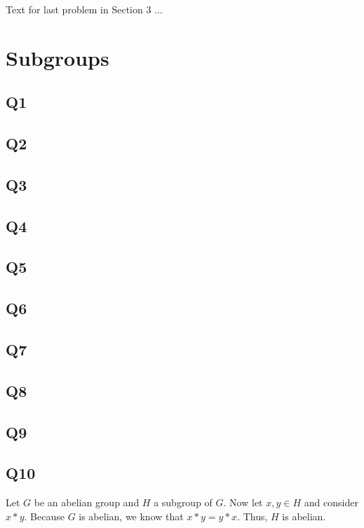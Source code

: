 \documentclass[12pt]{article}
\numberwithin{theorem}{section}
\numberwithin{equation}{section}
\numberwithin{remark}{section}
\numberwithin{definition}{section}
\numberwithin{theorem}{section}
\numberwithin{lemma}{section}
\numberwithin{example}{section}
\begin{document}
Text for last problem in Section 3 ...



\newpage

\section{Subgroups}

\subsection{Q1}

\subsection{Q2}

\subsection{Q3}

\subsection{Q4}

\subsection{Q5}

\subsection{Q6}

\subsection{Q7}

\subsection{Q8}

\subsection{Q9}

\subsection{Q10}

Let $G$ be an abelian group and $H$ a subgroup of $G$. Now let $x,y\in H$ and consider $x*y$. Because $G$ is abelian, we know that $x*y=y*x$. Thus, $H$ is abelian. 
\end{document}
